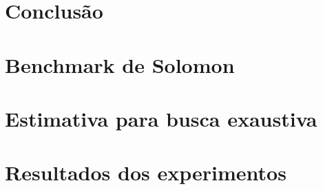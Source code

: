 \documentclass[a4paper,12pt,oneside,openany]{book}
\begin{document}

\chapter{Conclusão}
\label{cap5}


\normalsize
\cleardoublepage
{}



    \appendix
    \chapter{Benchmark de Solomon}
    \label{ApendiceA}
        
    \chapter{Estimativa para busca exaustiva}
    \label{ApendiceB}
        
    \chapter{Resultados dos experimentos}
    \label{ApendiceC}
        

\backmatter
\end{document}
